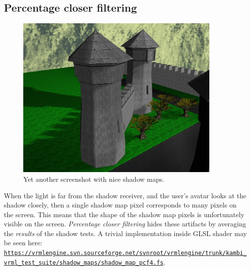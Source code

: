 \documentclass{acmsiggraph}                     %
\newcommand*{\myhref}[2]{\texttt{\href{#1}{\nolinkurl{#2}}}}
\begin{document}
\subsection{Percentage closer filtering}

\begin{figure}[b]
  \centering
  \includegraphics[width=4.0in]{sunny_street_above_view}
  \caption{Yet another screenshot with nice shadow maps.}
\end{figure}

When the light is far from the shadow receiver, and the user's avatar
looks at the shadow closely, then a single shadow map pixel
corresponds to many pixels on the screen. This means that the shape
of the shadow map pixels is unfortunately visible on the screen.
\emph{Percentage closer filtering} \cite{gpugems:pcf} hides these artifacts by
averaging
the \emph{results} of the shadow tests.
A trivial implementation inside GLSL shader may be seen here:
\myhref{https://vrmlengine.svn.sourceforge.net/svnroot/vrmlengine/trunk/kambi\_vrml\_test\_suite/shadow\_maps/shadow\_map\_pcf4.fs}{https://vrmlengine.svn.sourceforge.net/svnroot/vrmlengine/trunk/kambi_vrml_test_suite/shadow_maps/shadow_map_pcf4.fs}.
\end{document}
